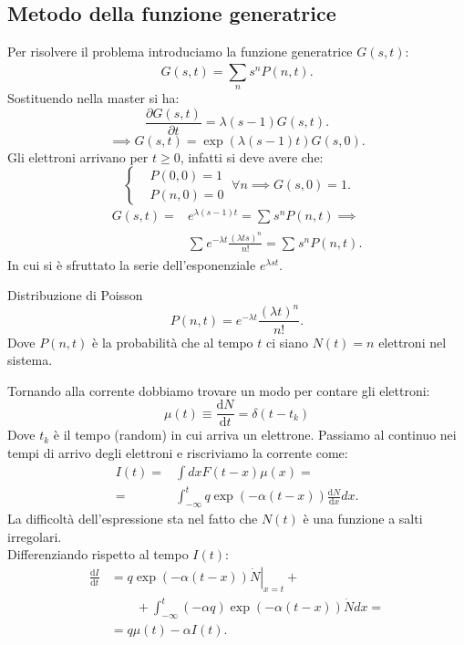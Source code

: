 \subsection{Metodo della funzione generatrice}%
Per risolvere il problema introduciamo la funzione generatrice $G(s,t)$:
\[
    G(s,t) =\sum_{n}^{} s^nP(n,t) 
.\] 
Sostituendo nella master si ha:
\[
    \frac{\partial G(s,t)}{\partial t} = \lambda (s-1) G(s,t)
.\] 
\[
     \implies  G(s,t) = \exp\left(\lambda (s-1) t\right)G(s,0) 
.\] 
Gli elettroni arrivano per $t\ge 0$, infatti si deve avere che: 
\[
    \begin{cases}
	&P(0,0)=1\\
	&P(n,0) = 0
    \end{cases}
    \ \forall n \implies  G(s,0) = 1 
.\] 
\[\begin{aligned}
    G(s,t) =& e^{\lambda (s-1) t} = \sum_{}^{} s^n P(n,t) \implies  \\
		&\sum_{}^{} e^{-\lambda t}\frac{\left(\lambda ts\right)^n }{n!}  = \sum_{}^{} s^nP(n,t) 
.\end{aligned}\]
In cui si è sfruttato la serie dell'esponenziale $e^{\lambda st}$.
\begin{redbox}{Distribuzione di Poisson}
    \[
	P(n,t)= e^{-\lambda t}\frac{\left(\lambda t\right)^{n}}{n!}
    .\] 
    Dove $P(n,t)$ è la probabilità che al tempo $t$ ci siano $N(t) =n$ elettroni nel sistema.
\end{redbox}
\noindent
Tornando alla corrente dobbiamo trovare un modo per contare gli elettroni:
\[
    \mu(t) \equiv 
    \frac{\text{d} N}{\text{d} t} 
    =\delta (t-t_k)  
\] 
Dove $t_k$ è il tempo (random) in cui arriva un elettrone.
Passiamo al continuo nei tempi di arrivo degli elettroni e riscriviamo la corrente come:
\[\begin{aligned}
    I(t) =& \int dx F(t-x) \mu(x) =\\
	 =&\int_{- \infty}^{t} q \exp\left(-\alpha (t-x) \right) \frac{\text{d} N}{\text{d} x} dx 
.\end{aligned}\]
La difficoltà dell'espressione sta nel fatto che $N(t)$ è una funzione a salti irregolari.\\
Differenziando rispetto al tempo $I(t)$:
\[\begin{aligned}
    \frac{\text{d} I}{\text{d} t} &= q\exp\left(-\alpha (t-x)\right)\left.\dot{N}\right|_{x=t} + \\
				   &\qquad +\int_{-\infty}^{t} \left(-\alpha q\right)\exp\left(-\alpha (t-x)\right)\dot{N}dx =\\
				   &= q\mu (t) - \alpha I(t) 
.\end{aligned}\]
